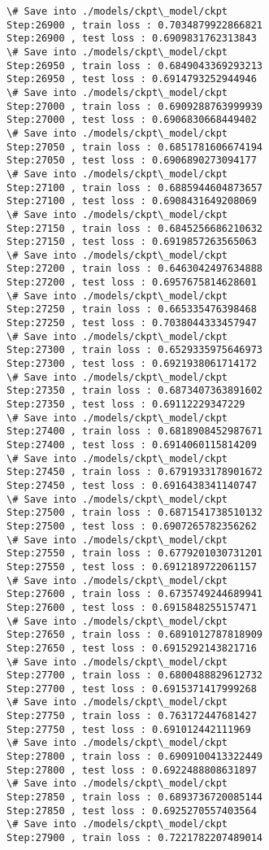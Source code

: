 \documentclass[11pt]{article}
\begin{document}
\begin{Verbatim}[commandchars=\\\{\}]
\# Save into ./models/ckpt\_model/ckpt
Step:26900 , train loss : 0.7034879922866821
Step:26900 , test loss : 0.6909831762313843
\# Save into ./models/ckpt\_model/ckpt
Step:26950 , train loss : 0.6849043369293213
Step:26950 , test loss : 0.6914793252944946
\# Save into ./models/ckpt\_model/ckpt
Step:27000 , train loss : 0.6909288763999939
Step:27000 , test loss : 0.6906830668449402
\# Save into ./models/ckpt\_model/ckpt
Step:27050 , train loss : 0.6851781606674194
Step:27050 , test loss : 0.6906890273094177
\# Save into ./models/ckpt\_model/ckpt
Step:27100 , train loss : 0.6885944604873657
Step:27100 , test loss : 0.6908431649208069
\# Save into ./models/ckpt\_model/ckpt
Step:27150 , train loss : 0.6845256686210632
Step:27150 , test loss : 0.6919857263565063
\# Save into ./models/ckpt\_model/ckpt
Step:27200 , train loss : 0.6463042497634888
Step:27200 , test loss : 0.6957675814628601
\# Save into ./models/ckpt\_model/ckpt
Step:27250 , train loss : 0.665335476398468
Step:27250 , test loss : 0.7038044333457947
\# Save into ./models/ckpt\_model/ckpt
Step:27300 , train loss : 0.6529335975646973
Step:27300 , test loss : 0.6921938061714172
\# Save into ./models/ckpt\_model/ckpt
Step:27350 , train loss : 0.6873407363891602
Step:27350 , test loss : 0.69112229347229
\# Save into ./models/ckpt\_model/ckpt
Step:27400 , train loss : 0.6818908452987671
Step:27400 , test loss : 0.6914060115814209
\# Save into ./models/ckpt\_model/ckpt
Step:27450 , train loss : 0.6791933178901672
Step:27450 , test loss : 0.6916438341140747
\# Save into ./models/ckpt\_model/ckpt
Step:27500 , train loss : 0.6871541738510132
Step:27500 , test loss : 0.6907265782356262
\# Save into ./models/ckpt\_model/ckpt
Step:27550 , train loss : 0.6779201030731201
Step:27550 , test loss : 0.6912189722061157
\# Save into ./models/ckpt\_model/ckpt
Step:27600 , train loss : 0.6735749244689941
Step:27600 , test loss : 0.6915848255157471
\# Save into ./models/ckpt\_model/ckpt
Step:27650 , train loss : 0.6891012787818909
Step:27650 , test loss : 0.6915292143821716
\# Save into ./models/ckpt\_model/ckpt
Step:27700 , train loss : 0.6800488829612732
Step:27700 , test loss : 0.6915371417999268
\# Save into ./models/ckpt\_model/ckpt
Step:27750 , train loss : 0.763172447681427
Step:27750 , test loss : 0.691012442111969
\# Save into ./models/ckpt\_model/ckpt
Step:27800 , train loss : 0.6909100413322449
Step:27800 , test loss : 0.6922488808631897
\# Save into ./models/ckpt\_model/ckpt
Step:27850 , train loss : 0.6893736720085144
Step:27850 , test loss : 0.6925270557403564
\# Save into ./models/ckpt\_model/ckpt
Step:27900 , train loss : 0.7221782207489014

\end{Verbatim}
\end{document}

